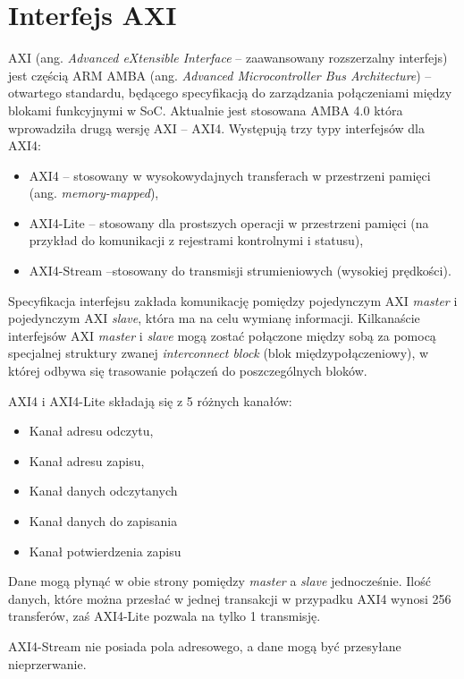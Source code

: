 \section{Interfejs AXI}
 AXI (ang. \textit{Advanced eXtensible Interface} --  zaawansowany rozszerzalny interfejs) jest częścią ARM AMBA (ang.\textit{ Advanced Microcontroller Bus Architecture}) -- otwartego standardu, będącego specyfikacją do zarządzania połączeniami między blokami funkcyjnymi w SoC. 
 Aktualnie jest stosowana AMBA 4.0 która wprowadziła drugą wersję AXI -- AXI4. 
 Występują trzy typy interfejsów dla AXI4:
\begin{itemize}
\item AXI4 -- stosowany w wysokowydajnych transferach w przestrzeni pamięci (ang. \textit{memory-mapped}),
\item AXI4-Lite -- stosowany dla prostszych operacji w przestrzeni pamięci (na przykład do komunikacji z rejestrami kontrolnymi i statusu),
\item AXI4-Stream --stosowany do transmisji strumieniowych (wysokiej prędkości). 
\end{itemize}
Specyfikacja interfejsu zakłada komunikację pomiędzy pojedynczym AXI \textit{master} i pojedynczym AXI \textit{slave}, która ma na celu wymianę informacji. 
Kilkanaście interfejsów AXI \textit{master} i \textit{slave} mogą zostać połączone między sobą za pomocą specjalnej struktury zwanej \textit{interconnect block} (blok międzypołączeniowy), w której odbywa się trasowanie połączeń do poszczególnych bloków. 

AXI4 i AXI4-Lite składają się z 5 różnych kanałów:
\begin{itemize}
\item Kanał adresu odczytu,
\item Kanał adresu zapisu,
\item Kanał danych odczytanych
\item Kanał danych do zapisania
\item Kanał potwierdzenia zapisu
\end{itemize}
Dane mogą płynąć w obie strony pomiędzy \textit{master} a \textit{slave} jednocześnie.
Ilość danych, które można przesłać w jednej transakcji w przypadku AXI4 wynosi 256 transferów, zaś AXI4-Lite pozwala na tylko 1 transmisję.



AXI4-Stream nie posiada pola adresowego, a dane mogą być przesyłane nieprzerwanie. 